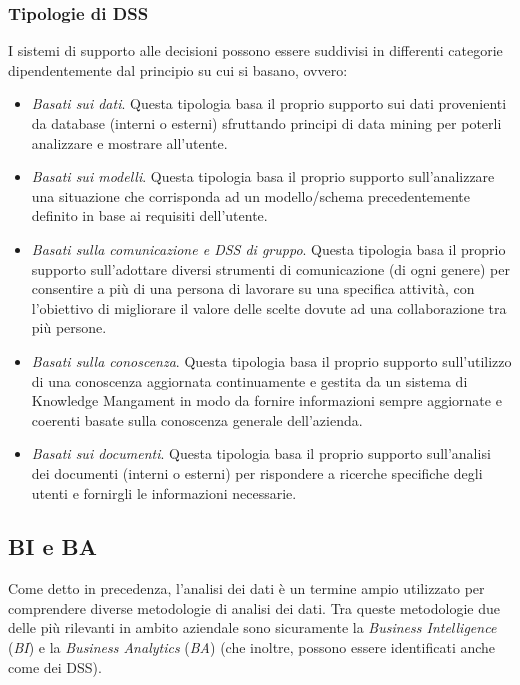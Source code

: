\subsubsection{Tipologie di DSS}

I sistemi di supporto alle decisioni possono essere suddivisi in differenti categorie dipendentemente dal principio su cui si basano, ovvero:\cite{techtarget_dss_types}

\begin{itemize}
    \item \textit{Basati sui dati}. Questa tipologia basa il proprio supporto sui dati provenienti da database (interni o esterni) sfruttando principi di data mining per poterli analizzare e mostrare all'utente.
    \item \textit{Basati sui modelli}. Questa tipologia basa il proprio supporto sull'analizzare una situazione che corrisponda ad un modello/schema precedentemente definito in base ai requisiti dell'utente.
    \item \textit{Basati sulla comunicazione e DSS di gruppo}. Questa tipologia basa il proprio supporto sull'adottare diversi strumenti di comunicazione (di ogni genere) per consentire a più di una persona di lavorare su una specifica attività, con l'obiettivo di migliorare il valore delle scelte dovute ad una collaborazione tra più persone.
    \item \textit{Basati sulla conoscenza}. Questa tipologia basa il proprio supporto sull'utilizzo di una conoscenza aggiornata continuamente e gestita da un sistema di Knowledge Mangament in modo da fornire informazioni sempre aggiornate e coerenti basate sulla conoscenza generale dell'azienda.
    \item \textit{Basati sui documenti}. Questa tipologia basa il proprio supporto sull'analisi dei documenti (interni o esterni) per rispondere a ricerche specifiche degli utenti e fornirgli le informazioni necessarie. 
\end{itemize}


\subsection{BI e BA}
Come detto in precedenza, l'analisi dei dati è un termine ampio utilizzato per comprendere diverse metodologie di analisi dei dati. Tra queste metodologie due delle più rilevanti in ambito aziendale sono sicuramente la \textit{Business Intelligence} (\textit{BI}) e la \textit{Business Analytics} (\textit{BA}) (che inoltre, possono essere identificati anche come dei DSS).

